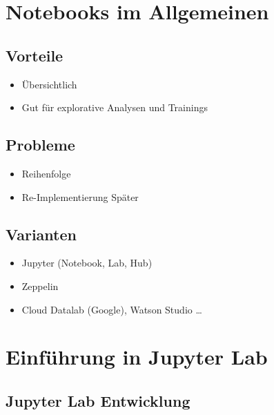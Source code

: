 \documentclass[11pt]{article}
\providecommand{\tightlist}{%
      \setlength{\itemsep}{0pt}\setlength{\parskip}{0pt}}
\begin{document}
    \hypertarget{notebooks-im-allgemeinen}{%
\section{Notebooks im Allgemeinen}\label{notebooks-im-allgemeinen}}

    \hypertarget{vorteile}{%
\subsection{Vorteile}\label{vorteile}}

\begin{itemize}
\tightlist
\item
  Übersichtlich
\item
  Gut für explorative Analysen und Trainings
\end{itemize}

    \hypertarget{probleme}{%
\subsection{Probleme}\label{probleme}}

\begin{itemize}
\tightlist
\item
  Reihenfolge
\item
  Re-Implementierung Später
\end{itemize}

    \hypertarget{varianten}{%
\subsection{Varianten}\label{varianten}}

\begin{itemize}
\tightlist
\item
  Jupyter (Notebook, Lab, Hub)
\item
  Zeppelin
\item
  Cloud Datalab (Google), Watson Studio \ldots{}
\end{itemize}

    \hypertarget{einfuxfchrung-in-jupyter-lab}{%
\section{Einführung in Jupyter Lab}\label{einfuxfchrung-in-jupyter-lab}}

    \hypertarget{jupyter-lab-entwicklung}{%
\subsection{Jupyter Lab Entwicklung}\label{jupyter-lab-entwicklung}}
\end{document}
